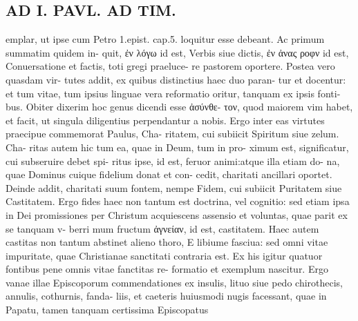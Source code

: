 \documentclass{article}
\begin{document}
\begin{pages}
\section*{AD I. PAVL. AD TIM. }
\marginpar{[ p.250 ]}emplar, ut ipse cum Petro 1.epist. cap.5. loquitur esse debeant. Ac primum summatim quidem in- quit, ἐν λόγω id est, Verbis siue dictis, ἐν ἀνας ροφν id est, Conuersatione et factis, toti gregi praeluce- re pastorem oportere. Postea vero quasdam vir- tutes addit, ex quibus distinctius haec duo paran- tur et docentur: et tum vitae, tum ipsius linguae vera reformatio oritur, tanquam ex ipsis fonti- bus. Obiter dixerim hoc genus dicendi esse ἀσύνθε- τον, quod maiorem vim habet, et facit, ut singula diligentius perpendantur a nobis. Ergo inter eas virtutes praecipue commemorat Paulus, Cha- ritatem, cui subiicit Spiritum siue zelum. Cha- ritas autem hic tum ea, quae in Deum, tum in pro- ximum est, significatur, cui subseruire debet spi- ritus ipse, id est, feruor animi:atque illa etiam do- na, quae Dominus cuique fidelium donat et con- cedit, charitati ancillari oportet. Deinde addit, charitati suum fontem, nempe Fidem, cui subiicit Puritatem siue Castitatem. Ergo fides haec non tantum est doctrina, vel cognitio: sed etiam ipsa in Dei promissiones per Christum acquiescens assensio et voluntas, quae parit ex se tanquam v- berri mum fructum ἀγνείαν, id est, castitatem. Haec autem castitas non tantum abstinet alieno thoro, E libiume fasciua: sed omni vitae impuritate, quae Christianae sanctitati contraria est. Ex his igitur quatuor fontibus pene omnis vitae fanctitas re- formatio et exemplum nascitur. Ergo vanae illae Episcoporum commendationes ex insulis, lituo siue pedo chirothecis, annulis, cothurnis, fanda- liis, et caeteris huiusmodi nugis facessant, quae in Papatu, tamen tanquam certissima Episcopatus 

\end{pages}
\end{document}
